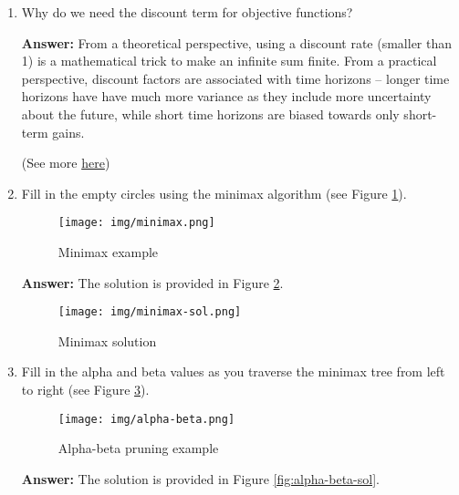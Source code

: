 \documentclass{article}
\newenvironment{QandA}{\begin{enumerate}[label=\arabic*.]}{\end{enumerate}}
\newenvironment{answer}{\par\normalfont \textbf{Answer:}}{}
\begin{document}
\begin{QandA}
\begin{answer}
        (Source: \href{https://www.quora.com/What-is-a-finite-horizon-in-the-context-of-reinforcement-learning}{Quora})
    \end{answer}

    \item Why do we need the discount term for objective functions?
    \begin{answer}
        From a theoretical perspective, using a discount rate (smaller than 1) is a mathematical trick to make an infinite sum finite. From a practical perspective, discount factors are associated with time horizons -- longer time horizons have have much more variance as they include more uncertainty about the future, while short time horizons are biased towards only short-term gains.

        (See more \href{https://stats.stackexchange.com/questions/221402/understanding-the-role-of-the-discount-factor-in-reinforcement-learning}{here})
    \end{answer}

    \item Fill in the empty circles using the minimax algorithm (see Figure \ref{fig:minimax}).
    
    \begin{figure}[h!]
        \centering
        \texttt{[image: img/minimax.png]}
        \caption{Minimax example}
        \label{fig:minimax}
    \end{figure}
    \begin{answer}
        The solution is provided in Figure \ref{fig:minimax-sol}.
    \end{answer}
    \begin{figure}[h!]
        \centering
        \texttt{[image: img/minimax-sol.png]}
        \caption{Minimax solution}
        \label{fig:minimax-sol}
    \end{figure}

    \item Fill in the alpha and beta values as you traverse the minimax tree from left to right (see Figure \ref{fig:alpha-beta}).
    \begin{figure}[h!]
        \centering
        \texttt{[image: img/alpha-beta.png]}
        \caption{Alpha-beta pruning example}
        \label{fig:alpha-beta}
    \end{figure}

    \begin{answer}
        The solution is provided in Figure \ref{fig:alpha-beta-sol}.
    \end{answer}


\end{QandA}
\end{document}

